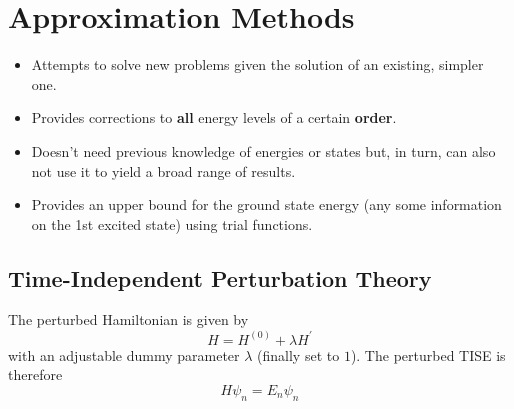 \section{Approximation Methods}

\begin{itemize}
    \item Attempts to solve new problems given the solution of an existing, simpler one.
    \item Provides corrections to \textbf{all} energy levels of a certain \textbf{order}.
\end{itemize}
\begin{itemize}
    \item Doesn't need previous knowledge of energies or states but, in turn, can also not use it to yield a broad range of results.
    \item Provides an upper bound for the ground state energy (any some information on the 1st excited state) using trial functions.
\end{itemize}

\subsection{Time-Independent Perturbation Theory}
The perturbed Hamiltonian is given by
\begin{equation*}
    H=H^{(0)}+\lambda H^{\prime}
\end{equation*}
with an adjustable dummy parameter $\lambda$ (finally set to $1$). The perturbed TISE is therefore
\begin{equation*}
    H\psi_n = E_n \psi_n
\end{equation*}

